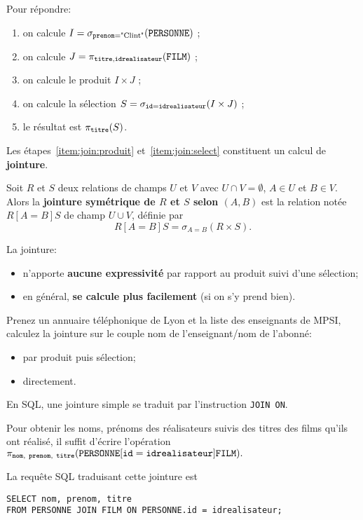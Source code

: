 Pour répondre:
\begin{enumerate}
\item on calcule $I=\sigma_{\mathtt{prenom}=\text{"Clint"}}(\mathtt{PERSONNE})$ ;
\item on calcule $J=\pi_{\mathtt{titre}, \mathtt{idrealisateur}}(\mathtt{FILM})$ ;
\item\label{item:join:produit}on calcule le produit $I\times J$ ;
\item\label{item:join:select}on calcule la sélection
  $S=\sigma_{\mathtt{id}=\mathtt{idrealisateur}}(I\times J)$ ;
\item le résultat est $\pi_{\mathtt{titre}}(S)$.
\end{enumerate}

Les étapes~\ref{item:join:produit} et~\ref{item:join:select}
constituent un calcul de \textbf{jointure}.
\begin{defi}[Jointure]
  Soit $R$ et $S$ deux relations de champs $U$ et $V$ avec
  $U\cap V = \emptyset$, $A\in U$ et $B\in V$.
  Alors
  la \textbf{jointure symétrique de $R$ et $S$ selon $(A,B)$} est la
  relation notée $R[A=B]S$ de
  champ $U\cup V$, définie par
  \begin{equation*}
    R[A=B] S = \sigma_{A=B}(R\times S).
  \end{equation*}
\end{defi}

La jointure:
\begin{itemize}
\item n'apporte \textbf{aucune expressivité} par rapport au produit suivi d'une  sélection;
\item en général, \textbf{se calcule plus facilement} (si on s'y prend   bien).
\end{itemize}

\begin{exemple}
  Prenez un annuaire téléphonique de Lyon et la liste des
enseignants de MPSI, calculez la jointure sur le couple nom de
l'enseignant/nom de l'abonné:
\begin{itemize}
\item par produit puis sélection;
\item directement.
\end{itemize}
\end{exemple}

En SQL, une jointure simple se traduit par l'instruction \texttt{JOIN ON}.
\begin{exemple}
Pour obtenir les noms, prénoms des réalisateurs suivis des titres des films qu'ils ont réalisé, il suffit d'écrire l'opération
$  \pi_{\mathtt{nom},\ \mathtt{prenom},\ \mathtt{titre}}(\mathtt{PERSONNE}[\mathtt{id} = \mathtt{idrealisateur}] \mathtt{FILM}).$

La requête SQL traduisant cette jointure est 
\begin{verbatim}
SELECT nom, prenom, titre
FROM PERSONNE JOIN FILM ON PERSONNE.id = idrealisateur;
\end{verbatim}

\end{exemple}

